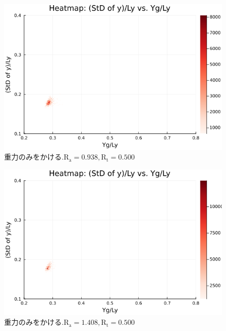 \begin{figure}[H]
  \centering
  \includegraphics[scale=0.6]{image/dT0_heat/2024-01-15T14:30:48.365_mapg0_chi0_Ay50_rho0.4_T0.43_dT0.0_Rd0.0_Rt0.5_Ra0.938769_g0.0003999718779659611_run4.0e7.png}
  \caption{$重力のみをかける. \text{R}_\text{a}=0.938,\text{R}_\text{t}=0.500$}
  \label{}
\end{figure}

\begin{figure}[H]
  \centering
  \includegraphics[scale=0.6]{image/dT0_heat/2024-01-15T14:30:48.432_mapg0_chi0_Ay50_rho0.4_T0.43_dT0.0_Rd0.0_Rt0.5_Ra1.4081535_g0.0003999718779659611_run4.0e7.png}
  \caption{$重力のみをかける. \text{R}_\text{a}=1.408,\text{R}_\text{t}=0.500$}
  \label{}
\end{figure}

